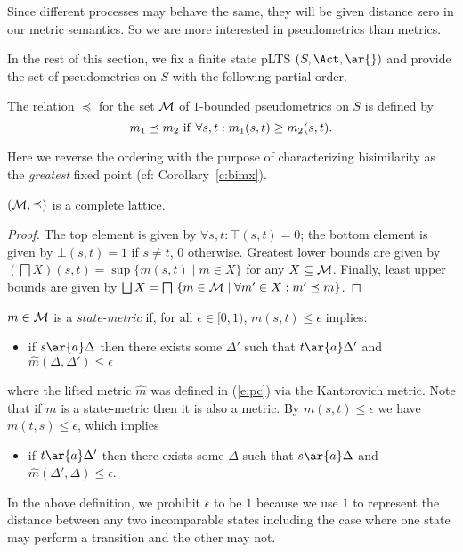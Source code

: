\documentclass{article}
\def \CM{{\cal M}}
\begin{document}
 Since different processes may behave  the same, they will be
  given distance zero in our metric semantics. So we are more
  interested in pseudometrics than metrics.

In the rest of this section, we fix a finite state pLTS
$(S,\Act,\ar{})$ and provide the set of pseudometrics on $S$ with
the following partial order.
\begin{definition}
The relation $\preceq$ for the set $\CM$ of $1$-bounded
pseudometrics on $S$ is defined by
\[m_1\preceq m_2\ {\rm if}\ \forall s,t: m_1(s,t)\geq
  m_2(s,t).\]
\end{definition}
Here we reverse the ordering with the purpose of
  characterizing bisimilarity as the {\em greatest} fixed point (cf:
  Corollary~\ref{c:bimx}).

\begin{lemma}\label{l:latt}
$(\CM,\preceq)$ is a complete lattice.
\end{lemma}
\begin{proof}
The top element is given by $\forall s,t:\top(s,t)=0$; the bottom
element is given by $\bot(s,t)=1$ if $s\not=t$, $0$ otherwise.
Greatest lower bounds are given by $(\bigsqcap
X)(s,t)=\sup\{m(s,t)\mid m\in X\}$ for any $X\subseteq\CM$. Finally,
least upper bounds are given by $\bigsqcup X=\bigsqcap\
\{m\in\CM\mid \forall m'\in X: m'\preceq m\}$.
\end{proof}


\begin{definition}\label{d:sm}
$m\in\CM$ is a {\em state-metric} if, for all
  $\epsilon\in [0,1)$, $m(s,t)\leq\epsilon$ implies:
\begin{itemize}
\item if $s\ar{a}\Delta$ then there exists some $\Delta'$ such that
  $t\ar{a}\Delta'$ and $\hat{m}(\Delta,\Delta')\leq\epsilon$
\end{itemize}
\end{definition}
where the lifted metric $\hat{m}$ was defined in (\ref{e:pc}) via
the Kantorovich metric. Note that if $m$ is a state-metric then it
is also a metric. By $m(s,t)\leq\epsilon$ we have
$m(t,s)\leq\epsilon$, which implies
\begin{itemize}
\item if $t\ar{a}\Delta'$ then there exists some $\Delta$ such that
  $s\ar{a}\Delta$ and $\hat{m}(\Delta',\Delta)\leq\epsilon$.
\end{itemize}
In the above definition, we prohibit $\epsilon$ to be $1$ because we
use $1$ to represent the distance between any two incomparable
states including the case where one state may perform a transition
and the other may not.
\end{document}
